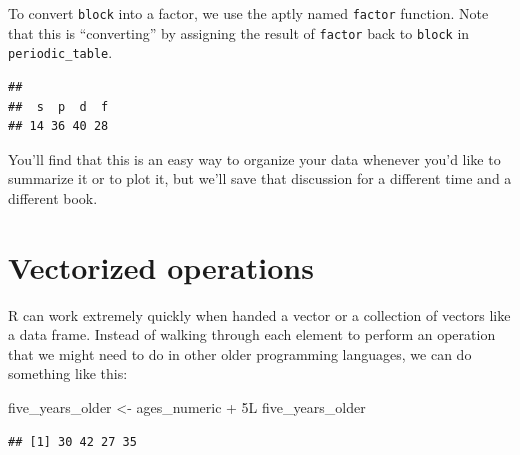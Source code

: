 \documentclass[]{tufte-book}
\newenvironment{Shaded}{\begin{snugshade}}{\end{snugshade}}
\newcommand{\KeywordTok}[1]{\textcolor[rgb]{0.13,0.29,0.53}{\textbf{{#1}}}}
\newcommand{\DataTypeTok}[1]{\textcolor[rgb]{0.13,0.29,0.53}{{#1}}}
\newcommand{\StringTok}[1]{\textcolor[rgb]{0.31,0.60,0.02}{{#1}}}
\newcommand{\NormalTok}[1]{{#1}}
\begin{document}
To convert \texttt{block} into a factor, we use the aptly named
\texttt{factor} function. Note that this is ``converting'' by assigning
the result of \texttt{factor} back to \texttt{block} in
\texttt{periodic\_table}.

\begin{Shaded}
\end{Shaded}

\begin{Shaded}
\end{Shaded}

\begin{verbatim}
## 
##  s  p  d  f 
## 14 36 40 28
\end{verbatim}

You'll find that this is an easy way to organize your data whenever
you'd like to summarize it or to plot it, but we'll save that discussion
for a different time and a different book.

\section{Vectorized operations}\label{vectorized-operations}

R can work extremely quickly when handed a vector or a collection of
vectors like a data frame. Instead of walking through each element to
perform an operation that we might need to do in other older programming
languages, we can do something like this:

\begin{Shaded}
\begin{Highlighting}[]
\NormalTok{five_years_older <-}\StringTok{ }\NormalTok{ages_numeric +}\StringTok{ }\NormalTok{5L}
\NormalTok{five_years_older}
\end{Highlighting}
\end{Shaded}

\begin{verbatim}
## [1] 30 42 27 35
\end{verbatim}
\end{document}
